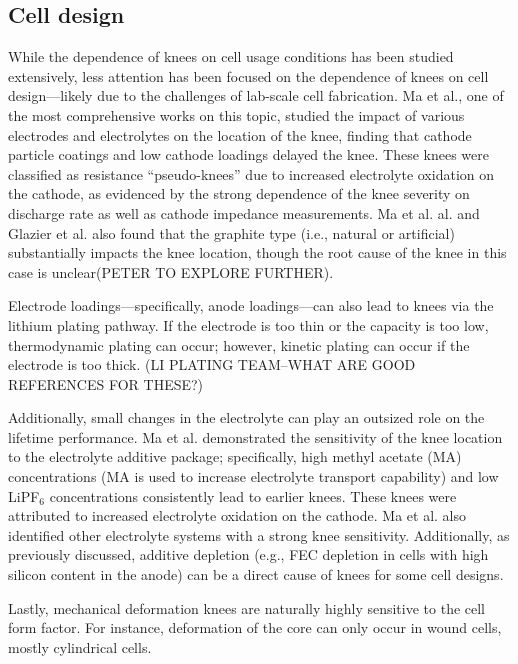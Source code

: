 \documentclass[journal=jpclcd,manuscript=article]{achemso}
\begin{document}
\subsection{Cell design}

While the dependence of knees on cell usage conditions has been studied extensively, less attention has been focused on the dependence of knees on cell design---likely due to the challenges of lab-scale cell fabrication. Ma et al.\cite{ma_editors_2019}, one of the most comprehensive works on this topic, studied the impact of various electrodes and electrolytes on the location of the knee, finding that cathode particle coatings and low cathode loadings delayed the knee. These knees were classified as resistance ``pseudo-knees'' due to increased electrolyte oxidation on the cathode, as evidenced by the strong dependence of the knee severity on discharge rate as well as cathode impedance measurements. Ma et al. al.\cite{ma_editors_2019} and Glazier et al.\cite{glazier_analysis_2017} also found that the graphite type (i.e., natural or artificial) substantially impacts the knee location, though the root cause of the knee in this case is unclear(PETER TO EXPLORE FURTHER).

Electrode loadings---specifically, anode loadings---can also lead to knees via the lithium plating pathway.
If the electrode is too thin or the capacity is too low, thermodynamic plating can occur; however, kinetic plating can occur if the electrode is too thick. (LI PLATING TEAM--WHAT ARE GOOD REFERENCES FOR THESE?)

Additionally, small changes in the electrolyte can play an outsized role on the lifetime performance. Ma et al.\cite{ma_editors_2019} demonstrated the sensitivity of the knee location to the electrolyte additive package; specifically, high methyl acetate (MA) concentrations (MA is used to increase electrolyte transport capability) and low LiPF$_6$ concentrations consistently lead to earlier knees. These knees were attributed to increased electrolyte oxidation on the cathode. Ma et al.\cite{ma_editors_2019} also identified other electrolyte systems with a strong knee sensitivity. Additionally, as previously discussed, additive depletion (e.g., FEC depletion in cells with high silicon content in the anode) can be a direct cause of knees for some cell designs.

Lastly, mechanical deformation knees are naturally highly sensitive to the cell form factor. For instance, deformation of the core \cite{pfrang_long-term_2018,carter_mechanical_2019,willenberg_development_2020} can only occur in wound cells, mostly cylindrical cells.
\end{document}
